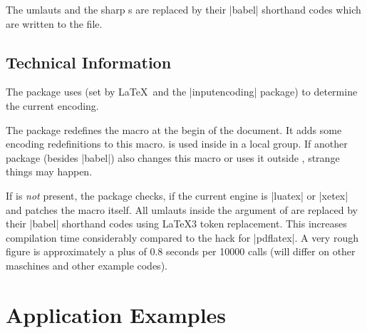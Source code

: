 \documentclass[a4paper,11pt]{ltxdoc}
\begin{document}
The umlauts and the sharp s are replaced by their |babel| shorthand codes
which are written to the  file.



\clearpage
\subsection{Technical Information}

The package uses  (set by \LaTeX\ and the |inputencoding| package)
to determine the current encoding.

The package redefines the \myverb{\@sanitize} macro at the begin of the
document. It adds some encoding redefinitions to this macro.
\myverb{\@sanitize} is used inside \myverb{\index} in a local group.
If another package (besides |babel|) also changes this macro or uses it
outside \myverb{\index}, strange things may happen.

If  is \emph{not} present, the package checks, if
the current engine is |luatex| or |xetex| and patches the \myverb{\index} macro
itself. All umlauts inside the argument of \myverb{\index} are replaced by their
|babel| shorthand codes using \LaTeX3 token replacement.
This increases compilation time considerably compared to the \myverb{\@sanitize} hack
for |pdflatex|. A very rough figure is approximately a plus of 0.8 seconds per
10000 \myverb{\index} calls (will differ on other maschines and other example codes).


\clearpage
\section{Application Examples}%

\end{document}

